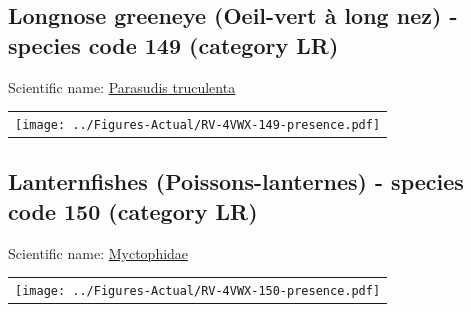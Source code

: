 \documentclass[12pt]{article}\usepackage[]{graphicx}\usepackage[]{color}
\begin{document}
\renewcommand\thefigure{\thesubsection\Alph{figure}}

\setcounter{figure}{0}

\hypertarget{sec:149}{%
\subsection{Longnose greeneye (Oeil-vert à long nez) - species code 149 (category LR)}\label{sec:149}}

  


Scientific name: \href{http://www.marinespecies.org/aphia.php?p=taxdetails\&id=158868}{Parasudis truculenta} \newline
\begin{minipage}{1.0\textwidth}
 \begin{tabular}{c}
\texttt{[image: ../Figures-Actual/RV-4VWX-149-presence.pdf]} \\ 
\end{tabular} 
\end{minipage}
\clearpage

\renewcommand\thefigure{\thesubsection\Alph{figure}}

\setcounter{figure}{0}

\hypertarget{sec:150}{%
\subsection{Lanternfishes (Poissons-lanternes) - species code 150 (category LR)}\label{sec:150}}

  


Scientific name: \href{http://www.marinespecies.org/aphia.php?p=taxdetails\&id=125498}{Myctophidae} \newline
\begin{minipage}{1.0\textwidth}
 \begin{tabular}{c}
\texttt{[image: ../Figures-Actual/RV-4VWX-150-presence.pdf]} \\ 
\end{tabular} 
\end{minipage}
\clearpage

\renewcommand\thefigure{\thesubsection\Alph{figure}}
\end{document}
